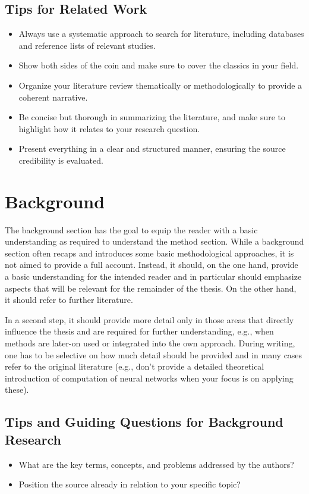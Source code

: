 \subsection*{Tips for Related Work}
\begin{itemize}
    \item Always use a systematic approach to search for literature, including databases and reference lists of relevant studies.
    \item Show both sides of the coin and make sure to cover the classics in your field.
    \item Organize your literature review thematically or methodologically to provide a coherent narrative.
    \item Be concise but thorough in summarizing the literature, and make sure to highlight how it relates to your research question.
    \item Present everything in a clear and structured manner, ensuring the source credibility is evaluated.
\end{itemize}

\section{Background}
The background section has the goal to equip the reader with a basic understanding as required to understand the method section. While a background section often recaps and introduces some basic methodological approaches, it is not aimed to provide a full account. Instead, it should, on the one hand, provide a basic understanding for the intended reader and in particular should emphasize aspects that will be relevant for the remainder of the thesis. On the other hand, it should refer to further literature.


In a second step, it should provide more detail only in those areas that directly influence the thesis and are required for further understanding, e.g., when methods are later-on used or integrated into the own approach. During writing, one has to be selective on how much detail should be provided and in many cases refer to the original literature (e.g., don't provide a detailed theoretical introduction of computation of neural networks when your focus is on applying these).

\subsection*{Tips and Guiding Questions for Background Research}
\begin{itemize}
    \item What are the key terms, concepts, and problems addressed by the authors?
    \item Position the source already in relation to your specific topic?
\end{itemize}
